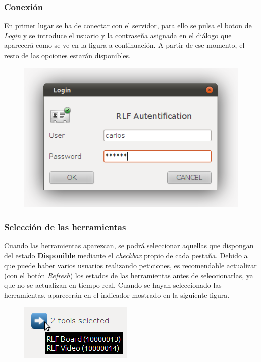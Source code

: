 \subsubsection*{Conexión}
En primer lugar se ha de conectar con el servidor, para ello se pulsa 
el boton de \textit{Login} y se introduce el usuario y la contraseña 
asignada en el diálogo que aparecerá como se ve en la figura 
a continuación. A partir de ese momento, el resto de las opciones 
estarán disponibles.

\begin{figure}[h]
	\centering
	\includegraphics[scale=0.8]{images/user/login.png}
\end{figure}



\subsubsection*{Selección de las herramientas}
Cuando las herramientas aparezcan, se podrá seleccionar aquellas que 
dispongan del estado \textbf{Disponible} mediante el \emph{checkbox} 
propio de cada pestaña. Debido a que puede haber varios usuarios 
realizando peticiones, es recomendable actualizar (con el botón 
\textit{Refresh}) los estados de las herramientas antes de 
seleccionarlas, ya que no se actualizan en tiempo real. Cuando se 
hayan seleccionado las herramientas, aparecerán en el indicador 
mostrado en la siguiente figura.

\begin{figure}[h]
	\centering
	\includegraphics[scale=0.8]{images/user/select.png}
\end{figure}

